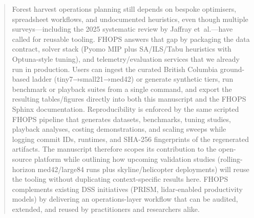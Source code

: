 \begin{abstract}
Forest harvest operations planning still depends on bespoke optimisers, spreadsheet workflows, and undocumented heuristics, even though multiple surveys—including the 2025 systematic review by Jaffray et~al.—have called for reusable tooling. FHOPS answers that gap by packaging the data contract, solver stack (Pyomo MIP plus SA/ILS/Tabu heuristics with Optuna-style tuning), and telemetry/evaluation services that we already run in production. Users can ingest the curated British Columbia ground-based ladder (tiny7→small21→med42) or generate synthetic tiers, run benchmark or playback suites from a single command, and export the resulting tables/figures directly into both this manuscript and the FHOPS Sphinx documentation. Reproducibility is enforced by the same scripted FHOPS pipeline that generates datasets, benchmarks, tuning studies, playback analyses, costing demonstrations, and scaling sweeps while logging commit IDs, runtimes, and SHA-256 fingerprints of the regenerated artifacts. The manuscript therefore scopes its contribution to the open-source platform while outlining how upcoming validation studies (rolling-horizon med42/large84 runs plus skyline/helicopter deployments) will reuse the tooling without duplicating context-specific results here. FHOPS complements existing DSS initiatives (PRISM, lidar-enabled productivity models) by delivering an operations-layer workflow that can be audited, extended, and reused by practitioners and researchers alike.
\end{abstract}
